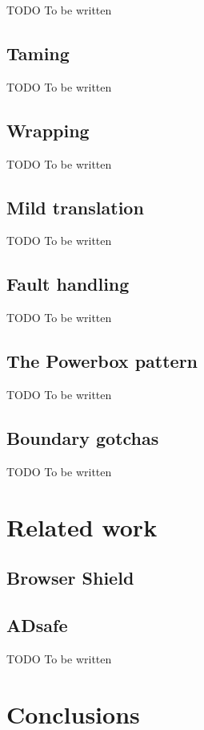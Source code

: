 \documentclass[letterpaper,twocolumn,10pt]{article}
\begin{document}
TODO To be written

\subsection{Taming}

TODO To be written

\subsection{Wrapping}

TODO To be written

\subsection{Mild translation}

TODO To be written

\subsection{Fault handling}

TODO To be written

\subsection{The Powerbox pattern}

TODO To be written

\subsection{Boundary gotchas}

TODO To be written

\section{Related work}
\label{sec:related}

\subsection{Browser Shield}

\subsection{ADsafe}

TODO To be written

\section{Conclusions}
\end{document}
